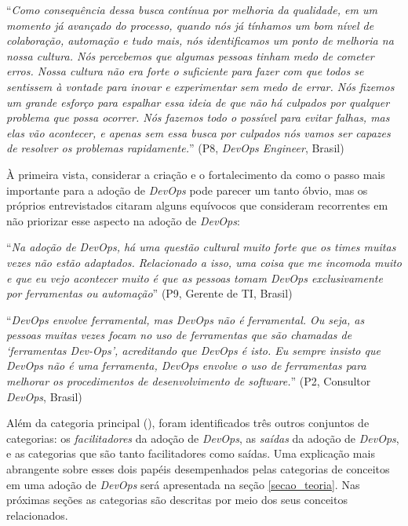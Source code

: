 \begin{mq}
``\emph{Como consequência dessa busca contínua por melhoria da qualidade, em um
momento já avançado do processo, quando nós já tínhamos um bom nível de
colaboração, automação e tudo mais, nós identificamos um ponto de melhoria na
nossa cultura. Nós percebemos que algumas pessoas tinham medo de cometer erros.
Nossa cultura não era forte o suficiente para fazer com que todos se sentissem
à vontade para inovar e experimentar sem medo de errar. Nós fizemos um grande
esforço para espalhar essa ideia de que não há culpados por qualquer problema
que possa ocorrer. Nós fazemos todo o possível para evitar falhas, mas elas
vão acontecer, e apenas sem essa busca por culpados nós vamos ser capazes de
resolver os problemas rapidamente.}'' (P8, {\it DevOps Engineer}, Brasil)
\end{mq}

À primeira vista, considerar a criação e o fortalecimento da \cc como o passo
mais importante para a adoção de {\it DevOps} pode parecer um tanto óbvio, mas
os próprios entrevistados citaram alguns equívocos que consideram recorrentes
em não priorizar esse aspecto na adoção de {\it DevOps}:

\begin{mq}``\emph{Na adoção de {\it DevOps}, há uma questão cultural muito forte
que os times muitas vezes não estão adaptados. Relacionado a isso, uma coisa
que me incomoda muito e que eu vejo acontecer muito é que as pessoas tomam
{\it DevOps} exclusivamente por ferramentas ou automação}'' (P9, Gerente de
\acrshort{TI}, Brasil)
\end{mq}

\begin{mq}
``\emph{DevOps envolve ferramental, mas DevOps não é ferramental. Ou seja, as
pessoas muitas vezes focam no uso de ferramentas que são chamadas de
`ferramentas Dev-Ops', acreditando que DevOps é isto. Eu sempre insisto que
DevOps não é uma ferramenta, DevOps envolve o uso de ferramentas para melhorar
os procedimentos de desenvolvimento de software.}'' (P2, Consultor {\it DevOps}, Brasil)
\end{mq}

Além da categoria principal (\cc), foram identificados três outros conjuntos de
categorias: os \emph{facilitadores} da adoção de {\it DevOps}, as \emph{saídas}
da adoção de {\it DevOps}, e as categorias que são tanto facilitadores como
saídas. Uma explicação mais abrangente sobre esses dois papéis desempenhados
pelas categorias de conceitos em uma adoção de {\it DevOps} será apresentada
na seção \ref{secao_teoria}. Nas próximas seções as categorias são descritas
por meio dos seus conceitos relacionados.

